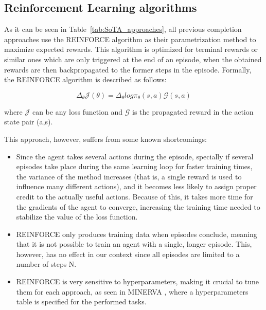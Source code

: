 \subsection{Reinforcement Learning algorithms}
\label{sec:RLalgorithms}

As it can be seen in Table~\ref{tab:SoTA_approaches}, all previous completion approaches use the REINFORCE algorithm as their parametrization method to maximize expected rewards. This algorithm is optimized for terminal rewards or similar ones which are only triggered at the end of an episode, when the obtained rewards are then backpropagated to the former steps in the episode. Formally, the REINFORCE algorithm is described as follows:

\begin{equation}
\label{eq:reinforce}
    \Delta_{\theta}\mathcal{J}(\theta) =\Delta_{\theta}log\pi_{\theta}(s,a)\mathcal{G}(s,a) 
\end{equation}

where $\mathcal{J}$ can be any loss function and $\mathcal{G}$ is the propagated reward in the action state pair (a,s).

This approach, however, suffers from some known shortcomings:
\begin{itemize}
    \item {Since the agent takes several actions during the episode, specially if several episodes take place during the same learning loop for faster training times, the variance of the method increases (that is, a single reward is used to influence many different actions), and it becomes less likely to assign proper credit to the actually useful actions. Because of this, it takes more time for the gradients of the agent to converge, increasing the training time needed to stabilize the value of the loss function.}
    \item {REINFORCE only produces training data when episodes conclude, meaning that it is not possible to train an agent with a single, longer episode. This, however, has no effect in our context since all episodes are limited to a number of steps N.}
    \item {REINFORCE is very sensitive to hyperparameters, making it crucial to tune them for each approach, as seen in MINERVA
    , where a hyperparameters table is specified for the performed tasks.}
\end{itemize}

